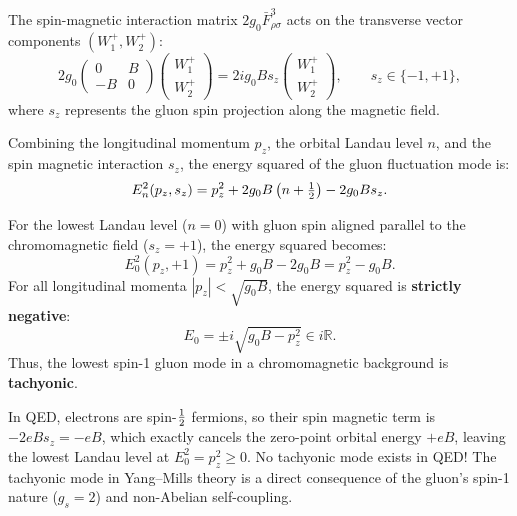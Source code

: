 The spin-magnetic interaction matrix $2 g_0 \bar{F}_{\rho\sigma}^3$ acts on the transverse vector components $(W_1^+, W_2^+)$:
\begin{equation}
2 g_0 \begin{pmatrix} 0 & B \\ -B & 0 \end{pmatrix} \begin{pmatrix} W_1^+ \\ W_2^+ \end{pmatrix} = 2 i g_0 B s_z \begin{pmatrix} W_1^+ \\ W_2^+ \end{pmatrix}, \qquad s_z \in \{-1, +1\},
\end{equation}
where $s_z$ represents the gluon spin projection along the magnetic field.

Combining the longitudinal momentum $p_z$, the orbital Landau level $n$, and the spin magnetic interaction $s_z$, the energy squared of the gluon fluctuation mode is:
\begin{equation}
\label{eq:ch10_master_gluon_spectrum}
E_n^2(p_z, s_z) = p_z^2 + 2 g_0 B \left( n + \tfrac{1}{2} \right) - 2 g_0 B s_z.
\end{equation}

\begin{theorem}
\label{thm:savvidy_tachyonic}
For the lowest Landau level ($n = 0$) with gluon spin aligned parallel to the chromomagnetic field ($s_z = +1$), the energy squared becomes:
\begin{equation}
\label{eq:ch10_tachyonic_energy}
E_0^2(p_z, +1) = p_z^2 + g_0 B - 2 g_0 B = p_z^2 - g_0 B.
\end{equation}
For all longitudinal momenta $|p_z| < \sqrt{g_0 B}$, the energy squared is \textbf{strictly negative}:
\begin{equation}
\label{eq:ch10_tachyonic_mode}
E_0 = \pm i \sqrt{g_0 B - p_z^2} \in i \mathbb{R}.
\end{equation}
Thus, the lowest spin-1 gluon mode in a chromomagnetic background is \textbf{tachyonic}.
\end{theorem}

In QED, electrons are spin-$\tfrac{1}{2}$ fermions, so their spin magnetic term is $-2 e B s_z = -e B$, which exactly cancels the zero-point orbital energy $+e B$, leaving the lowest Landau level at $E_0^2 = p_z^2 \ge 0$. No tachyonic mode exists in QED! The tachyonic mode in Yang--Mills theory is a direct consequence of the gluon's spin-1 nature ($g_s = 2$) and non-Abelian self-coupling.

